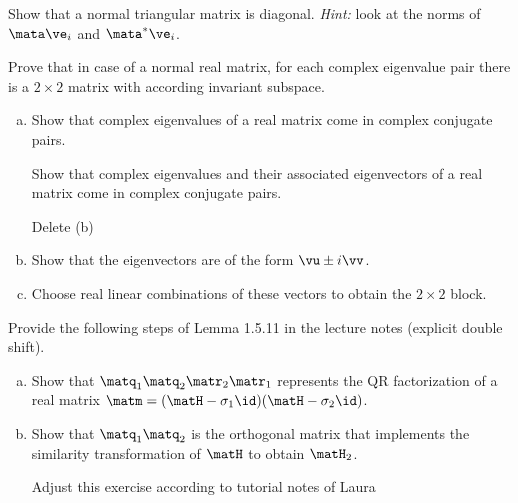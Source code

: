 
\begin{Sheet}
  \label{sheet5}

  \begin{Problem}
    Show that a normal triangular matrix is diagonal. \textit{Hint:}
    look at the norms of $\mata \ve_i$ and $\mata^*\ve_i$.
  \end{Problem}

  \begin{Problem}
    Prove that in case of a normal real matrix, for each complex
    eigenvalue pair there is a $2\times 2$ matrix with according
    invariant subspace.
    \begin{enumerate}[(a)]
    \item Show that complex eigenvalues of a real matrix come in
      complex conjugate pairs.
      \begin{todo}
        Show that complex eigenvalues and their associated
        eigenvectors of a real matrix come in complex conjugate
        pairs.

        Delete (b)
      \end{todo}
    \item Show that the eigenvectors are of the form $\vu\pm i\vv$.
    \item Choose real linear combinations of these vectors to obtain
      the $2\times 2$ block.
    \end{enumerate}
  \end{Problem}

  \begin{Problem}
    Provide the following steps of Lemma 1.5.11 in the lecture notes
    (explicit double shift).
    \begin{enumerate}[(a)]
    \item Show that $\matq_1\matq_2\matr_2\matr_1$ represents the QR
      factorization of a real matrix
      $\matm = (\matH - \sigma_1\id)(\matH - \sigma_2\id)$.
    \item Show that $\matq_1\matq_2$ is the orthogonal matrix that
      implements the similarity transformation of $\matH$ to obtain
      $\matH_2$.
      \begin{todo}
        Adjust this exercise according to tutorial notes of Laura
      \end{todo}
    \end{enumerate}
  \end{Problem}


\end{Sheet}
